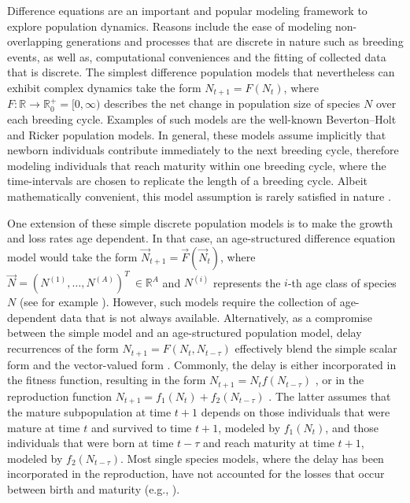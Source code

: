 \documentclass{article}
\numberwithin{theorem}{section}
\begin{document}
Difference equations are an important and popular modeling framework to explore population dynamics. Reasons include the ease of modeling non-overlapping generations and processes that are discrete in nature such as breeding events, as well as, computational conveniences and the fitting of collected data that is discrete. The simplest difference population models that nevertheless can exhibit complex dynamics take the form $N_{t+1}=F(N_t)$, where $F\colon \mathbb{R} \to \mathbb{R}^+_0=[0,\infty)$ describes the net change in population size  of species $N$ over each breeding cycle. Examples of such models are the well-known Beverton--Holt and Ricker population models. In general, these models assume implicitly that newborn individuals contribute immediately to the next breeding cycle, therefore modeling individuals that reach maturity within one breeding cycle, where the time-intervals are chosen to replicate the length of a breeding cycle. Albeit mathematically convenient, this model assumption is rarely satisfied in nature \cite{buddUniversalPredictionVertebrate}.

One extension of these simple discrete population models is to make the growth and loss rates  age dependent. In that case, an age-structured difference equation model would take the form $\overrightarrow{N}_{t+1}=\overrightarrow{F}(\overrightarrow{N}_t)$, where $\overrightarrow{N}=(N^{(1)},\ldots,N^{(A)})^T\ \in \mathbb{R}^A$ and $N^{(i)}$ represents the $i$-th age class of  species $N$ (see for example \cite{wikanAgeStageStructure2012,cushingIntroduction1998}). However, such models require the collection of   age-dependent data  that is  not always available. Alternatively, as a compromise between the simple model and an age-structured population model,  delay recurrences of the form $N_{t+1}=F(N_t,N_{t-\tau})$ effectively blend the simple scalar form and the vector-valued form \cite{Clark1976, derisoHarvestingStrategiesParameter1980}. Commonly, the delay is either incorporated in the fitness function, resulting in the form  $N_{t+1}=N_tf(N_{t-\tau})$  \cite{liChaosDiscreteDelay2012,sakerOscillationAttractivityDiscrete2007}, or in the reproduction function $N_{t+1}=f_1(N_t)+f_2(N_{t-\tau})$ \cite{Clark1976, panStabilityNeimarkSacker2021,streipertAlternativeDelayedPopulation2021}. The latter assumes that the mature subpopulation at time $t+1$ depends on those individuals that were mature at time $t$ and survived to time $t+1$, modeled by $f_1(N_t)$, and those individuals that were born at time $t-\tau$ and reach maturity at time $t+1$, modeled by $f_2(N_{t-\tau})$. Most single species models, where the delay has been incorporated in the reproduction, have not accounted for the losses that occur between birth and maturity (e.g., \cite{Clark1976,el-morshedyGloballyAttractingFixed2006}).
\end{document}

